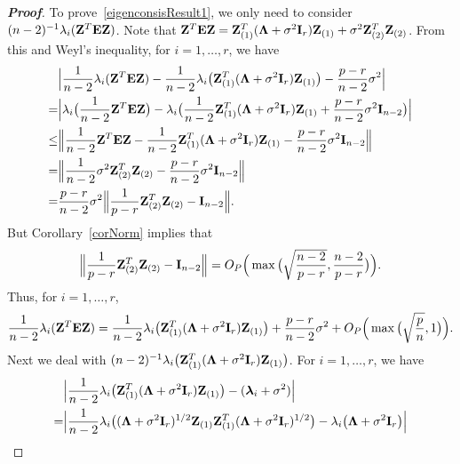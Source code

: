 \documentclass[review]{elsarticle}
\newcommand{\bZ}{\mathbf{Z}}
\newcommand{\bfsym}[1]{\ensuremath{\boldsymbol{#1}}}
\def\blambda {\bfsym {\lambda}}        \def\bLambda {\bfsym {\Lambda}}
\theoremstyle{plain}
\theoremstyle{definition}
\theoremstyle{remark}
\begin{document}
\begin{appendices}
\begin{proof}[\textbf{Proof}]
    To prove~\eqref{eigenconsisResult1}, we only need to consider $(n-2)^{-1}\lambda_i(\bZ^T \BE \bZ)$.
Note that
$
    \bZ^T \BE \bZ= \bZ_{(1)}^T (\bLambda +\sigma^2 \BI_r) \bZ_{(1)}+
\sigma^2 \bZ_{(2)}^T  \bZ_{(2)}
$.
From this and Weyl's inequality, 
for $i=1,\ldots, r$, we have 
$$
    \begin{aligned}
        &\Big|\frac{1}{n-2}\lambda_i(\BZ^T \BE \BZ)
    -\frac{1}{n-2}\lambda_i\big(\BZ_{(1)}^T (\bLambda+\sigma^2 \BI_r)\BZ_{(1)}\big)
    -\frac{p-r}{n-2}\sigma^2
    \Big|
        \\
        =&\Big|\lambda_i\big(\frac{1}{n-2}\BZ^T \BE \BZ\big)
        -\lambda_i\big(\frac{1}{n-2}\BZ_{(1)}^T (\bLambda+\sigma^2 \BI_r)\BZ_{(1)}+\frac{p-r}{n-2}\sigma^2 \BI_{n-2}\big)
    \Big|
        \\
        \leq &
        \Big\|\frac{1}{n-2}\BZ^T \BE \BZ
    -\frac{1}{n-2}\BZ_{(1)}^T (\bLambda+\sigma^2 \BI_r)\BZ_{(1)}
        -\frac{p-r}{n-2}\sigma^2\BI_{n-2}
        \Big\|
        \\
        = &
        \Big\|
        \frac{1}{n-2}\sigma^2 \bZ_{(2)}^T  \bZ_{(2)}
        -\frac{p-r}{n-2}\sigma^2\BI_{n-2}
        \Big\|
        \\
        = &
        \frac{p-r}{n-2}
\sigma^2
        \Big\|
        \frac{1}{p-r}
         \bZ_{(2)}^T  \bZ_{(2)}
        -\BI_{n-2}
        \Big\|.
    \end{aligned}
$$
    But Corollary~\ref{corNorm} implies that
    $$
        \Big\|
        \frac{1}{p-r}
         \bZ_{(2)}^T  \bZ_{(2)}
        -\BI_{n-2}
        \Big\|=O_P\Big(\max\big(\sqrt{\frac{n-2}{p-r}},\frac{n-2}{p-r}\big)\Big).
    $$
    Thus, for $i=1,\ldots,r$,
\begin{equation}\label{toutengjiayou1}
\frac{1}{n-2}\lambda_i(\BZ^T \BE \BZ)
=\frac{1}{n-2}\lambda_i\big(\BZ_{(1)}^T (\bLambda+\sigma^2 \BI_r)\BZ_{(1)}\big)
+\frac{p-r}{n-2}\sigma^2
+
O_P\Big(\max\big(\sqrt{\frac{p}{n}},1\big)\Big).
\end{equation}
    Next we deal with $(n-2)^{-1}\lambda_i\big(\BZ_{(1)}^T (\bLambda+\sigma^2 \BI_r)\BZ_{(1)}\big)$.
    For $i=1,\ldots, r$, we have
$$
    \begin{aligned}
        &\Big|\frac{1}{n-2}\lambda_i \big(\bZ_{(1)}^T(\bLambda+\sigma^2 \BI_r)\bZ_{(1)}\big)-(\blambda_i +\sigma^2)\Big|\\
        =&
        \Big|\frac{1}{n-2}\lambda_i \big((\bLambda+\sigma^2 \BI_r)^{1/2}\bZ_{(1)}\bZ_{(1)}^T(\bLambda+\sigma^2 \BI_r)^{1/2}\big)
        -\lambda_i\big(\bLambda+\sigma^2 \BI_r\big)\Big|\\

\end{aligned}$$
\end{proof}
\end{appendices}
\end{document}
